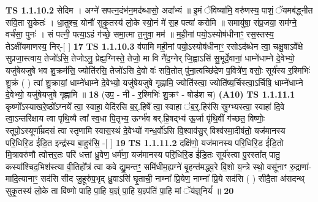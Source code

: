 \documentclass[17pt]{extarticle}
\begin{document}
                  \newline
                                \textbf{ TS 1.1.10.2} \newline
                  सेदिम । अग्ने॑ सपत्न॒दंभ॑न॒मद॑ब्धासो॒ अदा᳚भ्यं ॥ इ॒मं ॅविष्या॑मि॒ वरु॑णस्य॒ पाशं॒ ॅयमब॑द्ध्नीत सवि॒ता सु॒केतः॑ । धा॒तुश्च॒ योनौ॑ सुकृ॒तस्य॑ लो॒के स्यो॒नं मे॑ स॒ह पत्या॑ करोमि ॥ समायु॑षा॒ संप्र॒जया॒ सम॑ग्ने॒ वर्च॑सा॒ पुनः॑ । सं पत्नी॒ पत्या॒ऽहं ग॑च्छे॒ समा॒त्मा त॒नुवा॒ मम॑ ॥ म॒ही॒नां पयो॒ऽस्योष॑धीनाꣳ॒॒ रस॒स्तस्य॒ तेऽक्षी॑यमाणस्य॒ निर्-[ ] \textbf{  17 } \newline
                  \newline
                                \textbf{ TS 1.1.10.3} \newline
                  व॑पामि मही॒नां पयो॒ऽस्योष॑धीनाꣳ॒॒ रसोऽद॑ब्धेन त्वा॒ चक्षु॒षाऽवे᳚क्षे सुप्रजा॒स्त्वाय॒ तेजो॑ऽसि॒ तेजोऽनु॒ प्रेह्य॒ग्निस्ते॒ तेजो॒ मा वि नै॑द॒ग्नेर् जि॒ह्वाऽसि॑ सु॒भूर्दे॒वानां॒ धाम्ने॑धाम्ने दे॒वेभ्यो॒ यजु॑षेयजुषे भव शु॒क्रम॑सि॒ ज्योति॑रसि॒ तेजो॑ऽसि दे॒वो वः॑ सवि॒तोत् पु॑ना॒त्वच्छि॑द्रेण प॒वित्रे॑ण॒ वसोः॒ सूर्य॑स्य र॒श्मिभिः॑ शु॒क्रं ( ) त्वा॑ शु॒क्रायां॒ धाम्ने॑धाम्ने दे॒वेभ्यो॒ यजु॑षेयजुषे गृह्णामि॒ ज्योति॑स्त्वा॒ ज्योति॑ष्य॒र्चिस्त्वा॒ऽर्चिषि॒ धाम्ने॑धाम्ने दे॒वेभ्यो॒ यजु॑षेयजुषे गृह्णामि ॥ \textbf{  18} \newline
                  \newline
                      (उप॒ - नी - र॒श्मिभिः॑ शु॒क्रꣳ - षोड॑श च)  \textbf{(A10)} \newline \newline
                                        \textbf{ TS 1.1.11.1} \newline
                  कृष्णो᳚ऽस्याखरे॒ष्ठो᳚ऽग्नये᳚ त्वा॒ स्वाहा॒ वेदि॑रसि ब॒र्॒.हिषे᳚ त्वा॒ स्वाहा ॑ब॒र्॒.हिर॑सि स्रु॒ग्भ्यस्त्वा॒ स्वाहा॑ दि॒वे त्वा॒ऽन्तरि॑क्षाय त्वा पृथि॒व्यै त्वा᳚ स्व॒धा पि॒तृभ्य॒ ऊर्ग्भ॑व बर्.हि॒षद्भ्य॑  ऊ॒र्जा पृ॑थि॒वीं ग॑च्छत॒ विष्णोः॒ स्तूपो॒ऽस्यूर्णा᳚म्रदसं त्वा स्तृणामि स्वास॒स्थं दे॒वेभ्यो॑ गन्ध॒र्वो॑ऽसि वि॒श्वाव॑सु॒र् विश्व॑स्मा॒दीष॑तो॒ यज॑मानस्य परि॒धिरि॒ड ई॑डि॒त इन्द्र॑स्य बा॒हुर॑सि॒ -[ ] \textbf{  19} \newline
                  \newline
                                \textbf{ TS 1.1.11.2} \newline
                  दक्षि॑णो॒ यज॑मानस्य परि॒धिरि॒ड ई॑डि॒तो मि॒त्रावरु॑णौ त्वोत्तर॒तः परि॑ धत्तां ध्रु॒वेण॒ धर्म॑णा॒ यज॑मानस्य परि॒धिरि॒ड ई॑डि॒तः सूर्य॑स्त्वा पु॒रस्ता᳚त् पातु॒ कस्या᳚श्चिद॒भिश॑स्त्या वी॒तिहो᳚त्रं त्वा कवे द्यु॒मन्तꣳ॒॒ समि॑धीम॒ह्यग्ने॑ बृ॒हन्त॑मद्ध्व॒रे वि॒शो य॒न्त्रे स्थो॒ वसू॑नाꣳ रु॒द्राणा॑-मादि॒त्यानाꣳ॒॒ सद॑सि सीद जु॒हूरु॑प॒भृद् ध्रु॒वाऽसि॑ घृ॒ताची॒ नाम्ना᳚ प्रि॒येण॒ नाम्ना᳚ प्रि॒ये सद॑सि ( ) सीदै॒ता अ॑सदन्थ् सुकृ॒तस्य॑ लो॒के ता वि॑ष्णो पाहि पा॒हि य॒ज्ञ्ं पा॒हि य॒ज्ञ्प॑तिं पा॒हि मां ॅय॑ज्ञ्॒नियं᳚ ॥ \textbf{  20} \newline
\end{document}

